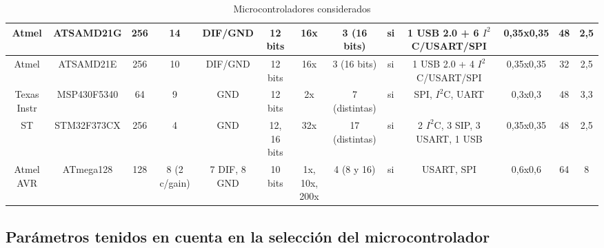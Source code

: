 \documentclass{article}
\theoremstyle{definition}
\theoremstyle{remark}
\begin{document}
\begin{landscape}
\begin{table}[!]
\begin{flushleft}
{\begin{tabular}{|c|c|c|c|c|c|c|c|c|c|c|c|c|}
\hline
 Atmel & ATSAMD21G &    256 &     14 & DIF/GND & 12 bits &    16x & 3 (16 bits) &     si & 1 USB 2.0 + 6 $I^{2}$C/USART/SPI & 0,35x0,35 &     48 &    2,5 \\
\hline
 Atmel & ATSAMD21E &    256 &     10 & DIF/GND & 12 bits &    16x & 3 (16 bits) &     si & 1 USB 2.0 + 4 $I^{2}$C/USART/SPI & 0,35x0,35 &     32 &    2,5 \\
\hline
Texas Instr & MSP430F5340 &     64 &      9 &    GND & 12 bits &     2x & 7 (distintas) &     si & SPI, $I^{2}$C, UART & 0,3x0,3 &     48 &    3,3 \\
\hline
    ST & STM32F373CX &    256 &      4 &    GND & 12, 16 bits &    32x & 17 (distintas) &     si & 2 $I^{2}$C, 3 SIP, 3 USART, 1 USB & 0,35x0,35 &     48 &    2,5 \\
\hline
Atmel AVR & ATmega128 &    128 & 8 (2 c/gain) & 7 DIF, 8 GND & 10 bits & 1x, 10x, 200x & 4 (8 y 16) &     si & USART, SPI & 0,6x0,6 &     64 &      8 \\
\hline
\end{tabular}



}
\end{flushleft}
  \caption{Microcontroladores considerados}\label{tab:microcontroladores}
\end{table}

\end{landscape}

\subsection{Parámetros tenidos en cuenta en la selección del microcontrolador} %
\label{sub:parametros_tenidos_en_cuenta_en_la_seleccion_del_microcontrolador}
\end{document}
